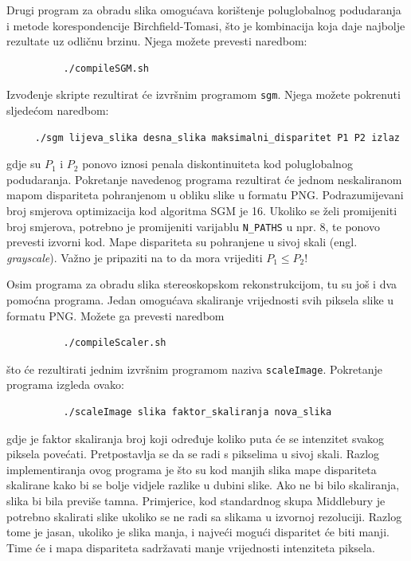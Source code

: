 \documentclass[utf8, zavrsni, numeric]{fer}
\begin{document}
Drugi program za obradu slika omogućava korištenje poluglobalnog podudaranja i metode korespondencije Birchfield-Tomasi, što je kombinacija koja daje najbolje rezultate uz odličnu brzinu.
Njega možete prevesti naredbom:
\begin{verbatim}
          ./compileSGM.sh
\end{verbatim}

Izvođenje skripte rezultirat će izvršnim programom {\tt sgm}. Njega možete pokrenuti sljedećom naredbom:
\begin{verbatim}
     ./sgm lijeva_slika desna_slika maksimalni_disparitet P1 P2 izlaz
\end{verbatim}
gdje su $P_1$ i $P_2$ ponovo iznosi penala diskontinuiteta kod poluglobalnog podudaranja.
Pokretanje navedenog programa rezultirat će jednom neskaliranom mapom dispariteta pohranjenom
u obliku slike u formatu PNG.
Podrazumijevani broj smjerova optimizacija kod algoritma SGM je 16. Ukoliko se želi promijeniti
broj smjerova, potrebno je promijeniti varijablu {\verb|N_PATHS|} u npr. 8, te ponovo prevesti izvorni kod. Mape dispariteta su pohranjene u sivoj skali (engl. {\sl grayscale}).
Važno je pripaziti na to da mora vrijediti $P_1 \leq P_2$\/!

Osim programa za obradu slika stereoskopskom rekonstrukcijom, tu su još i dva pomoćna programa. Jedan omogućava skaliranje vrijednosti svih piksela slike u formatu PNG. Možete ga prevesti
naredbom
\begin{verbatim}
          ./compileScaler.sh
\end{verbatim}
što će rezultirati jednim izvršnim programom naziva {\tt scaleImage}. Pokretanje programa
izgleda ovako:
\begin{verbatim}
          ./scaleImage slika faktor_skaliranja nova_slika
\end{verbatim}
gdje je faktor skaliranja broj koji određuje koliko puta će se intenzitet svakog piksela povećati. Pretpostavlja se da se radi s pikselima u sivoj skali. Razlog implementiranja ovog programa
je što su kod manjih slika mape dispariteta skalirane kako bi se bolje vidjele razlike u dubini slike. Ako ne bi bilo skaliranja, slika bi bila previše tamna. Primjerice, kod standardnog skupa Middlebury je potrebno skalirati slike ukoliko se ne radi sa slikama u izvornoj rezoluciji. Razlog tome je jasan, ukoliko je slika manja, i najveći mogući disparitet će biti manji.
Time će i mapa dispariteta sadržavati manje vrijednosti intenziteta piksela.
\end{document}
